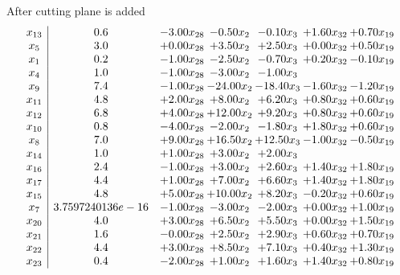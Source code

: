 \documentclass[8pt]{article}
\begin{document}
 After cutting plane is added 
\[\begin{array}{c| c c@{\hskip 2pt} c@{\hskip 2pt} c@{\hskip 2pt} c@{\hskip 2pt} c@{\hskip 2pt} }
 x_{13}   &  0.6 & -3.00 x_{28} & -0.50 x_{2} & -0.10 x_{3} & +  1.60 x_{32} & +  0.70 x_{19}\\
 x_{5}   &  3.0 & +  0.00 x_{28} & +  3.50 x_{2} & +  2.50 x_{3} & +  0.00 x_{32} & +  0.50 x_{19}\\
 x_{1}   &  0.2 & -1.00 x_{28} & -2.50 x_{2} & -0.70 x_{3} & +  0.20 x_{32} & -0.10 x_{19}\\
 x_{4}   &  1.0 & -1.00 x_{28} & -3.00 x_{2} & -1.00 x_{3} &    &   \\
 x_{9}   &  7.4 & -1.00 x_{28} & -24.00 x_{2} & -18.40 x_{3} & -1.60 x_{32} & -1.20 x_{19}\\
 x_{11}   &  4.8 & +  2.00 x_{28} & +  8.00 x_{2} & +  6.20 x_{3} & +  0.80 x_{32} & +  0.60 x_{19}\\
 x_{12}   &  6.8 & +  4.00 x_{28} & + 12.00 x_{2} & +  9.20 x_{3} & +  0.80 x_{32} & +  0.60 x_{19}\\
 x_{10}   &  0.8 & -4.00 x_{28} & -2.00 x_{2} & -1.80 x_{3} & +  1.80 x_{32} & +  0.60 x_{19}\\
 x_{8}   &  7.0 & +  9.00 x_{28} & + 16.50 x_{2} & + 12.50 x_{3} & -1.00 x_{32} & -0.50 x_{19}\\
 x_{14}   &  1.0 & +  1.00 x_{28} & +  3.00 x_{2} & +  2.00 x_{3} &    &   \\
 x_{16}   &  2.4 & -1.00 x_{28} & +  3.00 x_{2} & +  2.60 x_{3} & +  1.40 x_{32} & +  1.80 x_{19}\\
 x_{17}   &  4.4 & +  1.00 x_{28} & +  7.00 x_{2} & +  6.60 x_{3} & +  1.40 x_{32} & +  1.80 x_{19}\\
 x_{15}   &  4.8 & +  5.00 x_{28} & + 10.00 x_{2} & +  8.20 x_{3} & -0.20 x_{32} & +  0.60 x_{19}\\
 x_{7}   &  3.7597240136e-16 & -1.00 x_{28} & -3.00 x_{2} & -2.00 x_{3} & +  0.00 x_{32} & +  1.00 x_{19}\\
 x_{20}   &  4.0 & +  3.00 x_{28} & +  6.50 x_{2} & +  5.50 x_{3} & +  0.00 x_{32} & +  1.50 x_{19}\\
 x_{21}   &  1.6 & -0.00 x_{28} & +  2.50 x_{2} & +  2.90 x_{3} & +  0.60 x_{32} & +  0.70 x_{19}\\
 x_{22}   &  4.4 & +  3.00 x_{28} & +  8.50 x_{2} & +  7.10 x_{3} & +  0.40 x_{32} & +  1.30 x_{19}\\
 x_{23}   &  0.4 & -2.00 x_{28} & +  1.00 x_{2} & +  1.60 x_{3} & +  1.40 x_{32} & +  0.80 x_{19}\\

\end{array}\]
\end{document}
